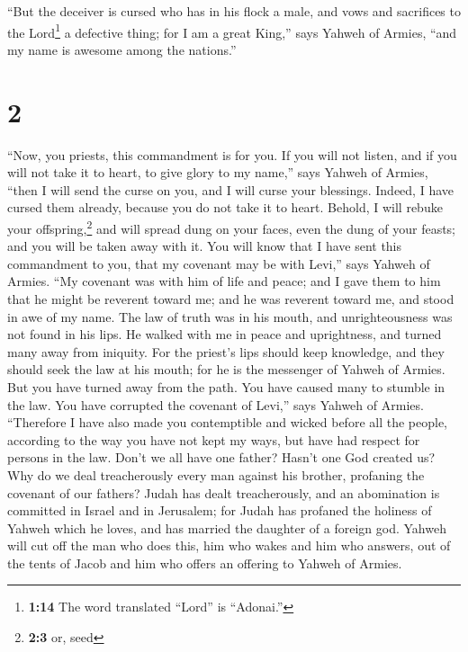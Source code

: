  ``But the deceiver is cursed who has in his flock a
male, and vows and sacrifices to the Lord\footnote{\textbf{1:14} The
  word translated ``Lord'' is ``Adonai.''} a defective thing; for I am a
great King,'' says Yahweh of Armies, ``and my name is awesome among the
nations.''

\hypertarget{section-1}{%
\section{2}\label{section-1}}

 ``Now, you priests, this commandment is for you.
 If you will not listen, and if you will not take it to
heart, to give glory to my name,'' says Yahweh of Armies, ``then I will
send the curse on you, and I will curse your blessings. Indeed, I have
cursed them already, because you do not take it to heart. 
Behold, I will rebuke your offspring,\footnote{\textbf{2:3} or, seed}
and will spread dung on your faces, even the dung of your feasts; and
you will be taken away with it.  You will know that I have
sent this commandment to you, that my covenant may be with Levi,'' says
Yahweh of Armies.  ``My covenant was with him of life and
peace; and I gave them to him that he might be reverent toward me; and
he was reverent toward me, and stood in awe of my name. 
The law of truth was in his mouth, and unrighteousness was not found in
his lips. He walked with me in peace and uprightness, and turned many
away from iniquity.  For the priest's lips should keep
knowledge, and they should seek the law at his mouth; for he is the
messenger of Yahweh of Armies.  But you have turned away
from the path. You have caused many to stumble in the law. You have
corrupted the covenant of Levi,'' says Yahweh of Armies. 
``Therefore I have also made you contemptible and wicked before all the
people, according to the way you have not kept my ways, but have had
respect for persons in the law.  Don't we all have one
father? Hasn't one God created us? Why do we deal treacherously every
man against his brother, profaning the covenant of our fathers?
 Judah has dealt treacherously, and an abomination is
committed in Israel and in Jerusalem; for Judah has profaned the
holiness of Yahweh which he loves, and has married the daughter of a
foreign god.  Yahweh will cut off the man who does this,
him who wakes and him who answers, out of the tents of Jacob and him who
offers an offering to Yahweh of Armies.

